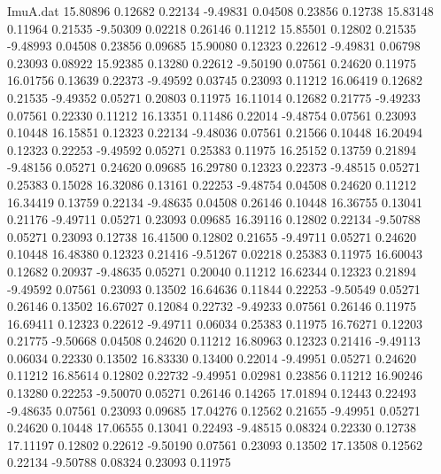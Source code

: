 \begin{filecontents}{ImuA.dat}
  15.80896    0.12682    0.22134   -9.49831    0.04508    0.23856    0.12738
  15.83148    0.11964    0.21535   -9.50309    0.02218    0.26146    0.11212
  15.85501    0.12802    0.21535   -9.48993    0.04508    0.23856    0.09685
  15.90080    0.12323    0.22612   -9.49831    0.06798    0.23093    0.08922
  15.92385    0.13280    0.22612   -9.50190    0.07561    0.24620    0.11975
  16.01756    0.13639    0.22373   -9.49592    0.03745    0.23093    0.11212
  16.06419    0.12682    0.21535   -9.49352    0.05271    0.20803    0.11975
  16.11014    0.12682    0.21775   -9.49233    0.07561    0.22330    0.11212
  16.13351    0.11486    0.22014   -9.48754    0.07561    0.23093    0.10448
  16.15851    0.12323    0.22134   -9.48036    0.07561    0.21566    0.10448
  16.20494    0.12323    0.22253   -9.49592    0.05271    0.25383    0.11975
  16.25152    0.13759    0.21894   -9.48156    0.05271    0.24620    0.09685
  16.29780    0.12323    0.22373   -9.48515    0.05271    0.25383    0.15028
  16.32086    0.13161    0.22253   -9.48754    0.04508    0.24620    0.11212
  16.34419    0.13759    0.22134   -9.48635    0.04508    0.26146    0.10448
  16.36755    0.13041    0.21176   -9.49711    0.05271    0.23093    0.09685
  16.39116    0.12802    0.22134   -9.50788    0.05271    0.23093    0.12738
  16.41500    0.12802    0.21655   -9.49711    0.05271    0.24620    0.10448
  16.48380    0.12323    0.21416   -9.51267    0.02218    0.25383    0.11975
  16.60043    0.12682    0.20937   -9.48635    0.05271    0.20040    0.11212
  16.62344    0.12323    0.21894   -9.49592    0.07561    0.23093    0.13502
  16.64636    0.11844    0.22253   -9.50549    0.05271    0.26146    0.13502
  16.67027    0.12084    0.22732   -9.49233    0.07561    0.26146    0.11975
  16.69411    0.12323    0.22612   -9.49711    0.06034    0.25383    0.11975
  16.76271    0.12203    0.21775   -9.50668    0.04508    0.24620    0.11212
  16.80963    0.12323    0.21416   -9.49113    0.06034    0.22330    0.13502
  16.83330    0.13400    0.22014   -9.49951    0.05271    0.24620    0.11212
  16.85614    0.12802    0.22732   -9.49951    0.02981    0.23856    0.11212
  16.90246    0.13280    0.22253   -9.50070    0.05271    0.26146    0.14265
  17.01894    0.12443    0.22493   -9.48635    0.07561    0.23093    0.09685
  17.04276    0.12562    0.21655   -9.49951    0.05271    0.24620    0.10448
  17.06555    0.13041    0.22493   -9.48515    0.08324    0.22330    0.12738
  17.11197    0.12802    0.22612   -9.50190    0.07561    0.23093    0.13502
  17.13508    0.12562    0.22134   -9.50788    0.08324    0.23093    0.11975

\end{filecontents}
